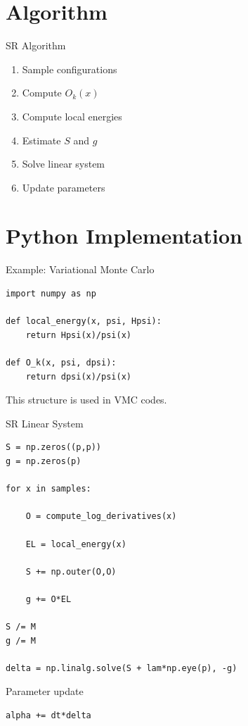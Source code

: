 \documentclass{beamer}
\begin{document}
\section{Algorithm}

\begin{frame}{SR Algorithm}

\begin{enumerate}
\item Sample configurations
\item Compute \(O_k(x)\)
\item Compute local energies
\item Estimate \(S\) and \(g\)
\item Solve linear system
\item Update parameters
\end{enumerate}
\end{frame}

\section{Python Implementation}

\begin{frame}[fragile]{Example: Variational Monte Carlo}

\begin{verbatim}
import numpy as np

def local_energy(x, psi, Hpsi):
    return Hpsi(x)/psi(x)

def O_k(x, psi, dpsi):
    return dpsi(x)/psi(x)
\end{verbatim}

This structure is used in VMC codes.
\end{frame}

\begin{frame}[fragile]{SR Linear System}

\begin{verbatim}
S = np.zeros((p,p))
g = np.zeros(p)

for x in samples:

    O = compute_log_derivatives(x)

    EL = local_energy(x)

    S += np.outer(O,O)

    g += O*EL

S /= M
g /= M

delta = np.linalg.solve(S + lam*np.eye(p), -g)
\end{verbatim}

Parameter update

\begin{verbatim}
alpha += dt*delta
\end{verbatim}
\end{frame}
\end{document}
